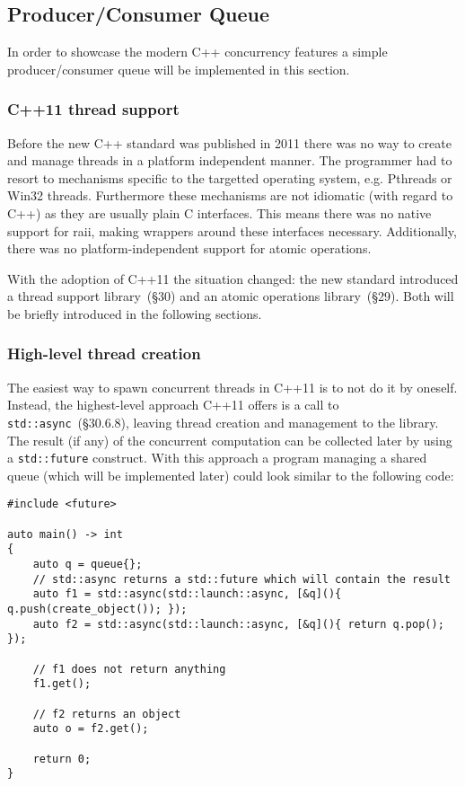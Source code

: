 \subsection{Producer/Consumer Queue}\label{queue}

In order to showcase the modern C++ concurrency features a simple producer/consumer queue will be implemented in this section.

\subsubsection{C++11 thread support}

Before the new C++ standard was published in 2011 there was no way to create and manage threads in a platform independent manner. The programmer had to resort to mechanisms specific to the targetted operating system, e.g. Pthreads or Win32 threads. Furthermore these mechanisms are not idiomatic (with regard to C++) as they are usually plain C interfaces. This means there was no native support for \gls{raii}, making wrappers around these interfaces necessary. Additionally, there was no platform-independent support for atomic operations.

With the adoption of C++11 the situation changed: the new standard introduced a thread support library~\cite{cpp11std}(§30) and an atomic operations library~\cite{cpp11std}(§29). Both will be briefly introduced in the following sections.

\subsubsection{High-level thread creation}

The easiest way to spawn concurrent threads in C++11 is to not do it by oneself. Instead, the highest-level approach C++11 offers is a call to \texttt{std::async}~\cite{cpp11std}(§30.6.8), leaving thread creation and management to the library. The result (if any) of the concurrent computation can be collected later by using a \texttt{std::future} construct. With this approach a program managing a shared queue (which will be implemented later) could look similar to the following code:

\begin{lstlisting}
#include <future>

auto main() -> int
{
    auto q = queue{};
    // std::async returns a std::future which will contain the result
    auto f1 = std::async(std::launch::async, [&q](){ q.push(create_object()); });
    auto f2 = std::async(std::launch::async, [&q](){ return q.pop(); });
 
    // f1 does not return anything
    f1.get();

    // f2 returns an object
    auto o = f2.get();

    return 0;
}
\end{lstlisting}

